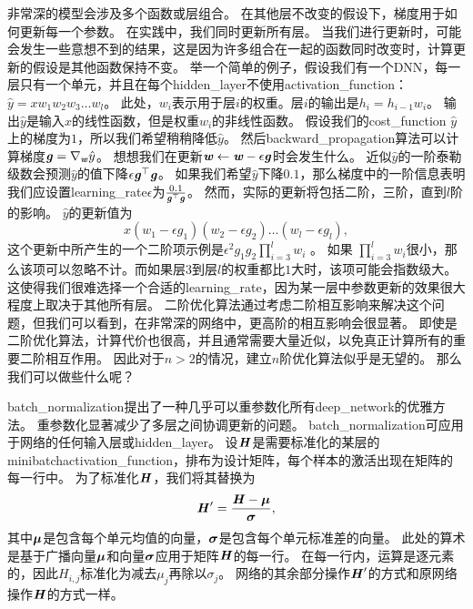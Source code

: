 非常深的模型会涉及多个函数或层组合。
在其他层不改变的假设下，梯度用于如何更新每一个参数。
在实践中，我们同时更新所有层。
当我们进行更新时，可能会发生一些意想不到的结果，这是因为许多组合在一起的函数同时改变时，计算更新的假设是其他函数保持不变。
举一个简单的例子，假设我们有一个\gls{DNN}，每一层只有一个单元，并且在每个\gls{hidden_layer}不使用\gls{activation_function}：$\hat{y} = xw_1 w_2 w_3 \dots w_l$。
此处，$w_i$表示用于层$i$的权重。层$i$的输出是$h_i = h_{i-1} w_i$。
输出$\hat{y}$是输入$x$的线性函数，但是权重$w_i$的非线性函数。
假设我们的\gls{cost_function} $\hat{y}$上的梯度为$1$，所以我们希望稍稍降低$\hat{y}$。
然后\gls{backward_propagation}算法可以计算梯度$\boldsymbol{\mathit{g}} = \nabla_{\boldsymbol{\mathit{w}}} \hat{y}$。
想想我们在更新$\boldsymbol{\mathit{w}} \leftarrow \boldsymbol{\mathit{w}} - \epsilon \boldsymbol{\mathit{g}}$时会发生什么。
近似$\hat{y}$的一阶泰勒级数会预测$\hat{y}$的值下降$\epsilon \boldsymbol{\mathit{g}}^\top \boldsymbol{\mathit{g}}$。
如果我们希望$\hat{y}$下降$0.1$，那么梯度中的一阶信息表明我们应设置\gls{learning_rate}$\epsilon$为$\frac{0.1}{\boldsymbol{\mathit{g}}^\top \boldsymbol{\mathit{g}}}$。
然而，实际的更新将包括二阶，三阶，直到$l$阶的影响。
$\hat{y}$的更新值为
\begin{equation}
    x(w_1-\epsilon g_1)(w_2-\epsilon g_2)\dots(w_l-\epsilon g_l),
\end{equation}
这个更新中所产生的一个二阶项示例是$\epsilon^2 g_1 g_2 \prod_{i=3}^l w_i$ 。
如果 $\prod_{i=3}^l w_i$很小，那么该项可以忽略不计。而如果层$3$到层$l$的权重都比$1$大时，该项可能会指数级大。
这使得我们很难选择一个合适的\gls{learning_rate}，因为某一层中参数更新的效果很大程度上取决于其他所有层。
二阶优化算法通过考虑二阶相互影响来解决这个问题，但我们可以看到，在非常深的网络中，更高阶的相互影响会很显著。
即使是二阶优化算法，计算代价也很高，并且通常需要大量近似，以免真正计算所有的重要二阶相互作用。
因此对于$n>2$的情况，建立$n$阶优化算法似乎是无望的。
那么我们可以做些什么呢？


\gls{batch_normalization}提出了一种几乎可以重参数化所有\gls{deep_network}的优雅方法。
重参数化显著减少了多层之间协调更新的问题。
\gls{batch_normalization}可应用于网络的任何输入层或\gls{hidden_layer}。
设$\boldsymbol{\mathit{H}}$是需要标准化的某层的\gls{minibatch}\gls{activation_function}，排布为设计矩阵，每个样本的激活出现在矩阵的每一行中。
为了标准化$\boldsymbol{\mathit{H}}$，我们将其替换为
\begin{equation}
\boldsymbol{\mathit{H}}' = \frac{\boldsymbol{\mathit{H}} - \boldsymbol{\mu}}{\boldsymbol{\sigma}},
\end{equation}
其中$\boldsymbol{\mu}$是包含每个单元均值的向量，$\boldsymbol{\sigma}$是包含每个单元标准差的向量。
此处的算术是基于广播向量$\boldsymbol{\mu}$和向量$\boldsymbol{\sigma}$应用于矩阵$\boldsymbol{\mathit{H}}$的每一行。
在每一行内，运算是逐元素的，因此$H_{i,j}$标准化为减去$\mu_j$再除以$\sigma_j$。
网络的其余部分操作$\boldsymbol{\mathit{H}}'$的方式和原网络操作$\boldsymbol{\mathit{H}}$的方式一样。

